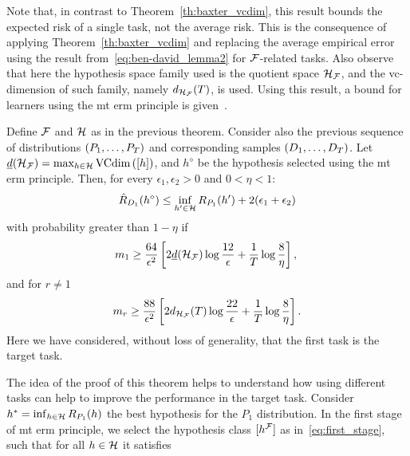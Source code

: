 Note that, in contrast to Theorem~\ref{th:baxter_vcdim}, this result bounds the expected risk of a single task, not the average risk. This is the consequence of applying Theorem~\ref{th:baxter_vcdim} and replacing the average empirical error using the result from~\eqref{eq:ben-david_lemma2} for $\mathcal{F}$-related tasks.
Also observe that here the hypothesis space family used is the quotient space $\mathcal{H}_{\mathcal{F}}$, and the \acrshort{vc}-dimension of such family, namely $d_{\mathcal{H}_{\mathcal{F}}}(T)$, is used.
%
Using this result, a bound for learners using the \acrshort{mt} \acrshort{erm} principle is given~\cite[Theorem~3]{Ben-DavidB08}. 
\begin{theorem}\label{th:ben-david_th3}
    Define $\mathcal{F}$ and $\mathcal{H}$ as in the previous theorem. Consider also the previous sequence of distributions $(P_1, \ldots, P_T)$ and corresponding samples $(D_1, \ldots, D_T)$. Let $\underline{d}(\mathcal{H}_{\mathcal{F}}) = \max_{h \in \mathcal{H}} \operatorname{VCdim}\left(\lbrack h\rbrack\right)$, and $h^\diamond$ be the hypothesis selected using the \acrshort{mt} \acrshort{erm} principle. Then, for every $\epsilon_1, \epsilon_2 > 0$ and $0 < \eta < 1$:
    \begin{equation}
        \nonumber
        {\hat{R}_{D_1}(h^\diamond)  \leq \inf_{h' \in \mathcal{H}}R_{P_1}(h')} + 2(\epsilon_1 + \epsilon_2)
    \end{equation}
    with probability greater than $1 - \eta$ if
    \begin{equation}
        \label{eq:ben-david_th3_ineq1}
        m_1 \geq  \frac{64}{\epsilon^2} \left[2 \underline{d}(\hypspace_\frelset) \log \frac{12}{\epsilon} + \frac{1}{\ntasks}\log\frac{8}{\eta} \right], \; 
    \end{equation}
    and for $r \neq 1$
    \begin{equation}
        \label{eq:ben-david_th3_ineq2}
        m_r \geq  \frac{88}{\epsilon^2} \left[2 d_{\hypspace_\frelset}(\ntasks) \log \frac{22}{\epsilon} + \frac{1}{\ntasks}\log\frac{8}{\eta} \right] .
    \end{equation}
    Here we have considered, without loss of generality, that the first task is the target task.
\end{theorem}
The idea of the proof of this theorem helps to understand how using different tasks can help to improve the performance in the target task. 
Consider $h^* = \inf_{h \in \mathcal{H}} R_{P_1}(h)$ the best hypothesis for the $P_1$ distribution.
%
In the first stage of \acrshort{mt} \acrshort{erm} principle, we select the hypothesis class $\lbrack h^{\mathcal{F}}\rbrack$ as in~\eqref{eq:first_stage}, such that for all $h \in \mathcal{H}$ it satisfies
